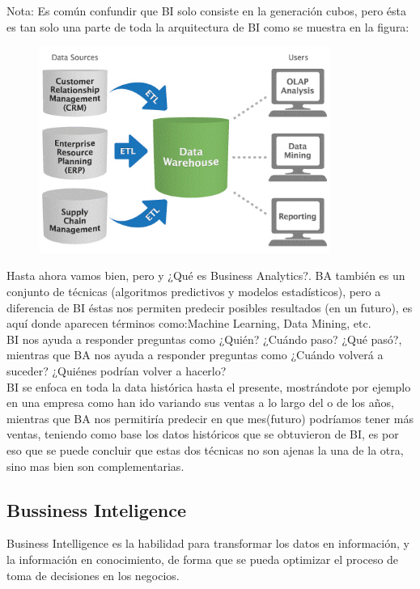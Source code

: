 \documentclass[preprint,12pt]{elsarticle}
\begin{document}
	Nota: Es común confundir que BI solo consiste en la generación cubos, pero ésta es tan solo una parte de toda la arquitectura de BI como se muestra en la figura:
	\begin{figure}[htb]
		\begin{center}
			\includegraphics[width=9.5cm]{./Imagenes/img3}
		\end{center}
	\end{figure}
	
	Hasta ahora vamos bien, pero y ¿Qué es Business Analytics?. BA también es un conjunto de técnicas (algoritmos predictivos y modelos estadísticos), pero a diferencia de BI éstas nos permiten predecir posibles resultados (en un futuro), es aquí donde aparecen términos como:Machine Learning, Data Mining, etc.\\
	
	BI nos ayuda a responder preguntas como ¿Quién? ¿Cuándo paso? ¿Qué pasó?, mientras que BA nos ayuda a responder preguntas como ¿Cuándo volverá a suceder?  ¿Quiénes podrían volver a hacerlo?\\
	
	BI se enfoca en toda la data histórica hasta el presente, mostrándote por ejemplo en una empresa como han ido variando sus ventas a lo largo del o de los años, mientras que BA nos permitiría predecir en que mes(futuro) podríamos tener más ventas, teniendo como base los datos históricos que se obtuvieron de BI, es por eso que se puede concluir que estas dos técnicas no son ajenas la una de la otra, sino mas bien son complementarias.\cite{bib01:BI:Online}
	
	\subsection{Bussiness Inteligence}
	
	Business Intelligence es la habilidad para transformar los datos en información, y la información en conocimiento, de forma que se pueda optimizar el proceso de toma de decisiones en los negocios.\\
	
\end{document}
